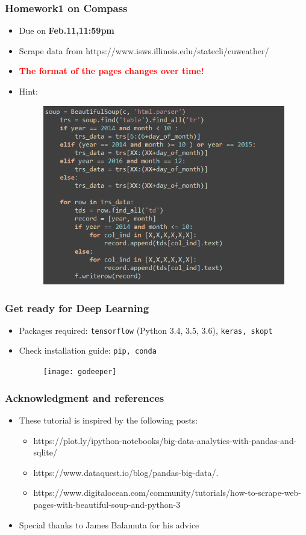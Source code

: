 \documentclass[red]{beamer}
\begin{document}
\begin{frame}
\frametitle{Homework1 on Compass}
\begin{itemize}
	\item Due on \textbf{Feb.11,11:59pm}
	\item Scrape data from https://www.isws.illinois.edu/statecli/cuweather/
	\item \textcolor{red}{\textbf{The format of the pages changes over time!}}
	\item Hint:
	\begin{figure}
		\centering
		\includegraphics[width=0.7\linewidth]{figure/screenshot040}
	\end{figure}
	
\end{itemize}

\end{frame}

\begin{frame}
\frametitle{Get ready for Deep Learning}
\begin{itemize}
	\item Packages required: \texttt{tensorflow} (Python 3.4, 3.5, 3.6), \texttt{keras, skopt}
	\item Check installation guide: \texttt{pip, conda}
	\begin{figure}
		\centering
		\texttt{[image: godeeper]}
	\end{figure}
	
	
\end{itemize}
\end{frame}

\begin{frame}
\frametitle{Acknowledgment and references}
\begin{itemize}
	\item These tutorial is inspired by the following posts:
	\vspace{2mm}
	\begin{itemize}
		\item https://plot.ly/ipython-notebooks/big-data-analytics-with-pandas-and-sqlite/
		\item https://www.dataquest.io/blog/pandas-big-data/.
		\item https://www.digitalocean.com/community/tutorials/how-to-scrape-web-pages-with-beautiful-soup-and-python-3
	\end{itemize}
	\vspace{2mm}
	\item  Special thanks to James Balamuta for his advice
\end{itemize}

\end{frame}
\end{document}
